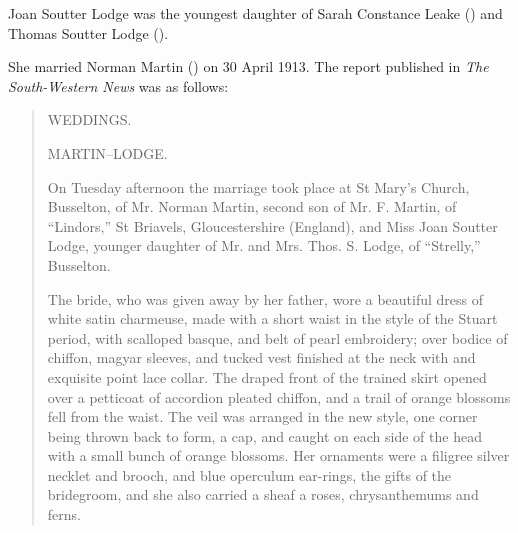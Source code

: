 
Joan Soutter Lodge was the youngest daughter of Sarah Constance Leake () and Thomas Soutter Lodge ().

She married Norman Martin () on 30 April 1913. The report published in \emph{The South-Western News} was as follows:\cite{SouthWestNews1913}

\begin{quotation}
WEDDINGS.

MARTIN--LODGE.

On Tuesday afternoon the marriage took place at St Mary's Church, Busselton, of Mr. Norman Martin, second son of Mr. F. Martin, of ``Lindors,'' St Briavels, Gloucestershire (England), and Miss Joan Soutter Lodge, younger daughter of Mr. and Mrs. Thos. S. Lodge, of ``Strelly,'' Busselton.

The bride, who was given away by her father, wore a beautiful dress of white satin charmeuse, made with a short waist in the style of the Stuart period, with scalloped basque, and belt of pearl embroidery; over bodice of chiffon, magyar sleeves, and tucked vest finished at the neck with and exquisite point lace collar. The draped front of the trained skirt opened over a petticoat of accordion pleated chiffon, and a trail of orange blossoms fell from the waist. The veil was arranged in the new style, one corner being thrown back to form, a cap, and caught on each side of the head with a small bunch of orange blossoms. Her ornaments were a filigree silver necklet and brooch, and blue operculum ear-rings, the gifts of the bridegroom, and she also carried a sheaf a roses, chrysanthemums and ferns.


\end{quotation}

